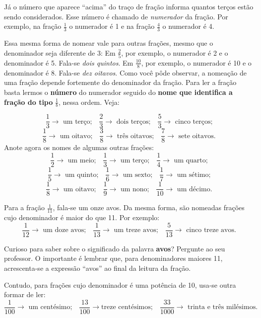 \documentclass[a4,12pt]{book}
\begin{document}
Já o número que aparece ``acima'' do traço de fração informa quantos terços estão sendo considerados. Esse número é chamado de {\it numerador} da fração. Por exemplo, na fração $\frac{1}{3}$ o numerador é 1 e na fração $\frac{4}{3}$ o numerador é 4.

Essa mesma forma de nomear vale para outras frações, mesmo que o denominador seja diferente de 3:\mbox{} \newline 
Em $\frac{2}{5}$, por exemplo, o numerador é 2 e o denominador é 5. Fala-se {\it dois quintos}.\mbox{} \newline 
Em $\frac{10}{8}$, por exemplo, o numerador é 10 e o denominador é 8. Fala-se {\it dez oitavos}. \mbox{} \newline 
Como você pôde observar, a nomeação de uma fração depende fortemente do denominador da fração. Para ler a fração basta lermos o {\bf número} do numerador seguido do {\bf nome que identifica a fração do tipo} $\frac{1}{b}$, nessa ordem. Veja:

$$\frac{1}{3}\rightarrow \text{ um terço;} \quad \frac{2}{3}\rightarrow \text{ dois terços;} \quad \frac{5}{3}\rightarrow \text{ cinco terços;}$$
$$\frac{1}{8}\rightarrow \text{ um oitavo;} \quad \frac{3}{8}\rightarrow \text{ três oitavos;} \quad \frac{7}{8}\rightarrow \text{ sete oitavos.}$$
Anote agora os nomes de algumas outras frações:
$$\frac{1}{2}\rightarrow \text{  um meio;} \quad \frac{1}{3}\rightarrow\text{  um terço;} \quad \frac{1}{4}\rightarrow\text{  um quarto;}$$
$$\frac{1}{5}\rightarrow\text{  um quinto;}\quad \frac{1}{6}\rightarrow\text{  um sexto;} \quad \frac{1}{7}\rightarrow\text{  um sétimo;}$$
$$\frac{1}{8}\rightarrow\text{  um oitavo;}\quad \frac{1}{9}\rightarrow\text{  um nono;}\quad \frac{1}{10}\rightarrow\text{  um décimo.}$$

Para a fração $\frac{1}{11}$, fala-se um onze avos. Da mesma forma, são nomeadas frações cujo denominador é maior do que 11. Por exemplo:
$$\frac{1}{12}\rightarrow \text{  um doze avos;}\quad \frac{1}{13}\rightarrow \text{ um treze avos;} \quad \frac{5}{13}\rightarrow \text{ cinco treze avos.}$$

Curioso para saber sobre o significado da palavra {\bf avos}? Pergunte ao seu professor. O importante é lembrar que, para denominadores maiores 11, acrescenta-se a expressão ``avos'' ao final da leitura da fração.

Contudo, para frações cujo denominador é uma potência de 10, usa-se outra formar de ler:
$$\frac{1}{100}\rightarrow \text{ um centésimo;}\quad \frac{13}{100} \rightarrow \text{treze centésimos;} \quad
\frac{33}{1000}\rightarrow \text{ trinta e três milésimos.}$$
\end{document}
